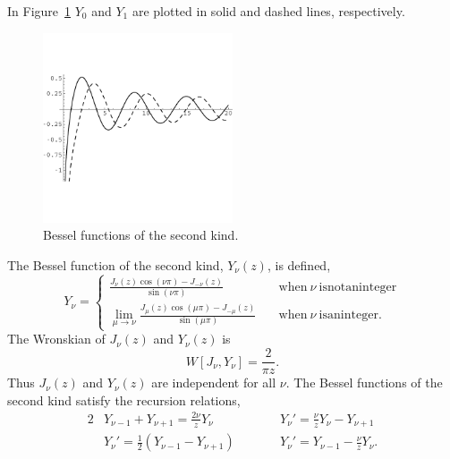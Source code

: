 In Figure~\ref{bessely} $Y_0$ and $Y_1$ are plotted in solid and dashed lines,
respectively.


\begin{figure}[h!]
  \begin{center}
    \includegraphics[width=0.5\textwidth]{ode/bessel/bessely}
  \end{center}
  \caption{Bessel functions of the second kind.}
  \label{bessely}
\end{figure}



\begin{Result}
  The Bessel function of the second kind, $Y_\nu(z)$,  is defined,
  \[ Y_\nu
  = \begin{cases}
    \frac{J_\nu(z) \cos(\nu \pi) 
      - J_{-\nu}(z)}{\sin(\nu \pi)} 
    \quad &\mathrm{when}\ \nu\ \mathrm{is not an integer} \\
    \lim_{\mu \to \nu} \frac{J_\mu(z) \cos(\mu \pi) 
      - J_{-\mu}(z)}{\sin(\mu \pi)} 
    \quad &\mathrm{when}\ \nu\ \mathrm{is an integer}.
  \end{cases}
  \]
  The Wronskian of $J_\nu(z)$ and $Y_\nu(z)$ is
  \[ W[J_\nu, Y_\nu] = \frac{2}{\pi z}. \]
  Thus $J_\nu(z)$ and $Y_\nu(z)$ are independent for all $\nu$.
  The Bessel functions of the second kind satisfy the recursion relations,
  \begin{alignat*}{2}
    &Y_{\nu-1} + Y_{\nu+1} = \frac{2\nu}{z} Y_\nu &\qquad
    &Y_\nu' = \frac{\nu}{z} Y_\nu - Y_{\nu+1} 
    \\
    &Y_\nu' = \frac{1}{2} (Y_{\nu-1} - Y_{\nu+1}) &\qquad
    &Y_\nu' = Y_{\nu-1} - \frac{\nu}{z} Y_\nu.
  \end{alignat*}
\end{Result}



















